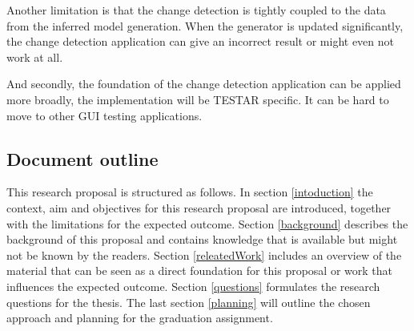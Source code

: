 Another limitation is that the change detection is tightly coupled to the data from the inferred model generation. When the generator is updated significantly, the change detection application can give an incorrect result or might even not work at all. 

And secondly, the foundation of the change detection application can be applied more broadly, the implementation will be TESTAR specific. It can be hard to move to other GUI testing applications.

\subsection{Document outline}
This research proposal is structured as follows. In section \ref{intoduction} the context, aim and objectives for this research proposal are introduced, together with the limitations for the expected outcome. Section \ref{background} describes the background of this proposal and contains knowledge that is available but might not be known by the readers. Section \ref{releatedWork} includes an overview of the material that can be seen as a direct foundation for this proposal or work that influences the expected outcome. Section \ref{questions} formulates the research questions for the thesis. The last section \ref{planning} will outline the chosen approach and planning for the graduation assignment.